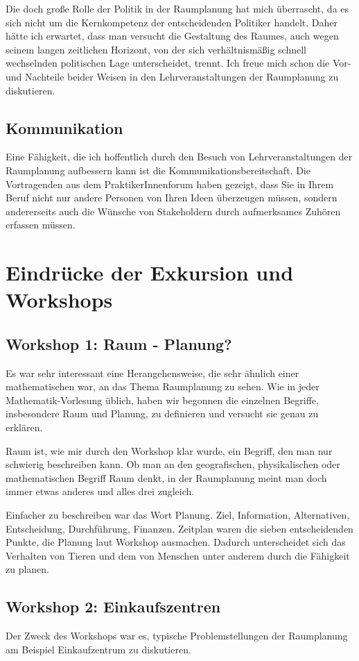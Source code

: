 \documentclass[]{article}
\begin{document}
Die doch große Rolle der Politik in der Raumplanung hat mich überrascht, da es sich nicht um die Kernkompetenz der entscheidenden Politiker handelt. Daher hätte ich erwartet, dass man versucht die Gestaltung des Raumes, auch wegen seinem langen zeitlichen Horizont, von der sich verhältnismäßig schnell wechselnden politischen Lage unterscheidet, trennt. Ich freue mich schon die Vor- und Nachteile beider Weisen in den Lehrveranstaltungen der Raumplanung zu diskutieren.

\subsection{Kommunikation}
Eine Fähigkeit, die ich hoffentlich durch den Besuch von Lehrveranstaltungen der Raumplanung aufbessern kann ist die Kommunikationsbereitschaft. Die Vortragenden aus dem PraktikerInnenforum haben gezeigt, dass Sie in Ihrem Beruf nicht nur andere Personen von Ihren Ideen überzeugen müssen, sondern andererseits auch die Wünsche von Stakeholdern durch aufmerksames Zuhören erfassen müssen.

\section{Eindrücke der Exkursion und Workshops}
\subsection{Workshop 1: Raum - Planung?}
Es war sehr interessant eine Herangehensweise, die sehr ähnlich einer mathematischen war, an das Thema Raumplanung zu sehen. Wie in jeder Mathematik-Vorlesung üblich, haben wir begonnen die einzelnen Begriffe, insbesondere Raum und Planung, zu definieren und versucht sie genau zu erklären.

Raum ist, wie mir durch den Workshop klar wurde, ein Begriff, den man nur schwierig beschreiben kann. Ob man an den geografischen, physikalischen oder mathematischen Begriff Raum denkt, in der Raumplanung meint man doch immer etwas anderes und alles drei zugleich.

Einfacher zu beschreiben war das Wort Planung. Ziel, Information, Alternativen, Entscheidung, Durchführung, Finanzen, Zeitplan waren die sieben entscheidenden Punkte, die Planung laut Workshop ausmachen. Dadurch unterscheidet sich das Verhalten von Tieren und dem von Menschen unter anderem durch die Fähigkeit zu planen.

\subsection{Workshop 2: Einkaufszentren}
\label{sec:einkaufszentren}
Der Zweck des Workshops war es, typische Problemstellungen der Raumplanung am Beispiel Einkaufzentrum zu diskutieren.
\end{document}
